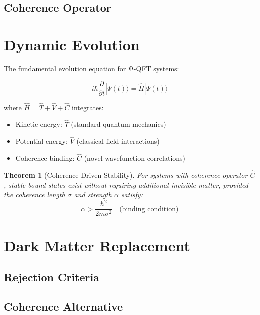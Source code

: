 \documentclass{article}
\newtheorem{theorem}{Theorem}[section]
\begin{document}
\begin{tcolorbox}[colback=blue!5!white,colframe=blue!75!black,title=Coherence Operator]
\begin{tcolorbox}[title={Executive Summary - OBINexus Framework},obinexus]
\begin{tcolorbox}[title={Core Premise (Technical)},theory]
\subsection{Coherence Operator}

\section{Dynamic Evolution}

The fundamental evolution equation for Ψ-QFT systems:

\begin{equation}
i\hbar \frac{\partial}{\partial t}|\Psi(t)\rangle = \hat{H}|\Psi(t)\rangle
\end{equation}

where $\hat{H} = \hat{T} + \hat{V} + \hat{C}$ integrates:
\begin{itemize}
\item Kinetic energy: $\hat{T}$ (standard quantum mechanics)
\item Potential energy: $\hat{V}$ (classical field interactions) 
\item Coherence binding: $\hat{C}$ (novel wavefunction correlations)
\end{itemize}

\begin{theorem}[Coherence-Driven Stability]
For systems with coherence operator $\hat{C}$, stable bound states exist without requiring additional invisible matter, provided the coherence length $\sigma$ and strength $\alpha$ satisfy:
\begin{equation}
\alpha > \frac{\hbar^2}{2m\sigma^2} \quad \text{(binding condition)}
\end{equation}
\end{theorem}

\section{Dark Matter Replacement}

\subsection{Rejection Criteria}
\show@DarkMatterRejection


\subsection{Coherence Alternative}


\end{tcolorbox}
\end{tcolorbox}
\end{tcolorbox}
\end{document}
